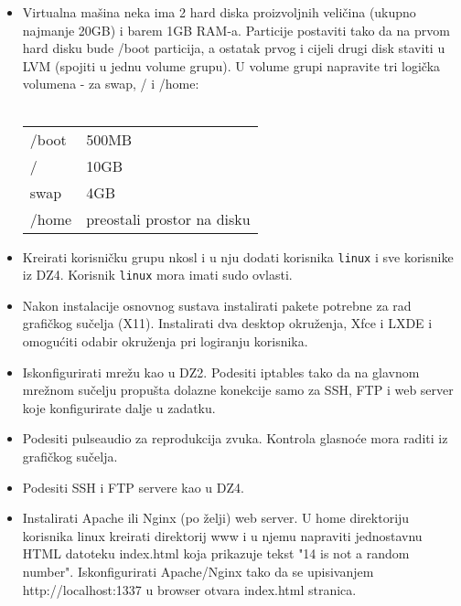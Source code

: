 \documentclass[12pt,a4paper]{article}
\begin{document}
	\hfill
	\hfill
	\begin{itemize}
		\item Virtualna mašina neka ima 2 hard diska proizvoljnih veličina (ukupno najmanje 20GB) i barem 1GB RAM-a. Particije postaviti tako da na prvom hard disku bude /boot particija, a ostatak prvog i cijeli drugi disk staviti u LVM (spojiti u jednu volume grupu). U volume grupi napravite tri logička volumena - za swap, / i /home:\\
		\,\\
		\begin{tabular}{l l}
			/boot & 500MB\\
			/ & 10GB\\
			swap & 4GB\\
			/home & preostali prostor na disku
  		\end{tabular}
  		
  		\item Kreirati korisničku grupu nkosl i u nju dodati korisnika \texttt{linux} i sve korisnike iz DZ4. Korisnik \texttt{linux} mora imati sudo ovlasti.
  		
  		\item Nakon instalacije osnovnog sustava instalirati pakete potrebne za rad grafičkog sučelja (X11). Instalirati dva desktop okruženja, Xfce i LXDE i omogućiti odabir okruženja pri logiranju korisnika.
  		
  		\item Iskonfigurirati mrežu kao u DZ2. Podesiti iptables tako da na glavnom mrežnom sučelju propušta dolazne konekcije samo za SSH, FTP i web server koje konfigurirate dalje u zadatku.
  		
  		\item Podesiti pulseaudio za reprodukcija zvuka. Kontrola glasnoće mora raditi iz grafičkog sučelja.
  		
  		\item Podesiti SSH i FTP servere kao u DZ4. 
  		
  		\item Instalirati Apache ili Nginx (po želji) web server. U home direktoriju korisnika linux kreirati direktorij www i u njemu napraviti jednostavnu HTML datoteku index.html koja prikazuje tekst "14 is not a random number". Iskonfigurirati Apache/Nginx tako da se upisivanjem http://localhost:1337 u browser otvara index.html stranica.
  	\end{itemize}
\end{document}
